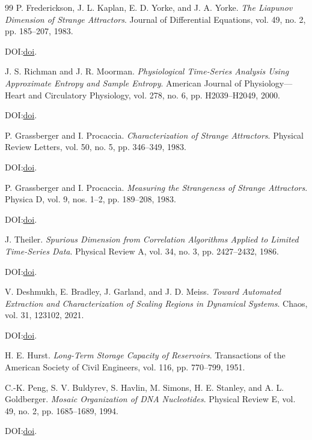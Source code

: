 \documentclass[11pt]{article}
\begin{document}
\begin{thebibliography}{99}
P. Frederickson, J. L. Kaplan, E. D. Yorke, and J. A. Yorke.
\emph{The Liapunov Dimension of Strange Attractors}.
Journal of Differential Equations, vol. 49, no. 2, pp. 185--207, 1983.
\par\noindent DOI:\@ \href{https://doi.org/10.1016/0022-0396(83)90011-6}{doi}.

J. S. Richman and J. R. Moorman.
\emph{Physiological Time-Series Analysis Using Approximate Entropy and
Sample Entropy}.
American Journal of Physiology---Heart and Circulatory Physiology,
vol. 278, no. 6, pp. H2039--H2049, 2000.
\par\noindent DOI:\@ \href{https://doi.org/10.1152/ajpheart.2000.278.6.H2039}{doi}.

P. Grassberger and I. Procaccia.
\emph{Characterization of Strange Attractors}.
Physical Review Letters, vol. 50, no. 5, pp. 346--349, 1983.
\par\noindent DOI:\@ \href{https://doi.org/10.1103/PhysRevLett.50.346}{doi}.

P. Grassberger and I. Procaccia.
\emph{Measuring the Strangeness of Strange Attractors}.
Physica D, vol. 9, nos. 1--2, pp. 189--208, 1983.
\par\noindent DOI:\@ \href{https://doi.org/10.1016/0167-2789(83)90298-1}{doi}.

J. Theiler.
\emph{Spurious Dimension from Correlation Algorithms Applied to Limited Time-Series Data}.
Physical Review A, vol. 34, no. 3, pp. 2427--2432, 1986.
\par\noindent DOI:\@ \href{https://doi.org/10.1103/PhysRevA.34.2427}{doi}.

V. Deshmukh, E. Bradley, J. Garland, and J. D. Meiss.
\emph{Toward Automated Extraction and Characterization of Scaling Regions in Dynamical Systems}.
Chaos, vol. 31, 123102, 2021.
\par\noindent DOI:\@ \href{https://doi.org/10.1063/5.0069365}{doi}.

H. E. Hurst.
\emph{Long-Term Storage Capacity of Reservoirs}.
Transactions of the American Society of Civil Engineers,
vol. 116, pp. 770--799, 1951.

C.-K. Peng, S. V. Buldyrev, S. Havlin, M. Simons, H. E. Stanley,
and A. L. Goldberger.
\emph{Mosaic Organization of DNA Nucleotides}.
Physical Review E, vol. 49, no. 2, pp. 1685--1689, 1994.
\par\noindent DOI:\@ \href{https://doi.org/10.1103/PhysRevE.49.1685}{doi}.


\end{thebibliography}
\end{document}
